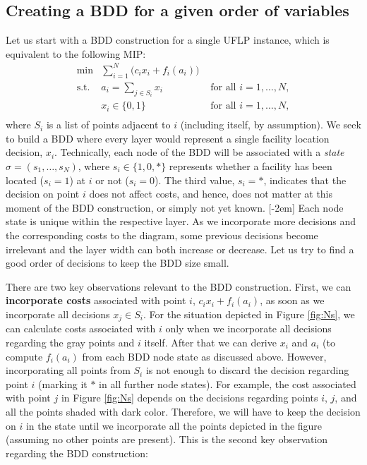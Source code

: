 \documentclass[11pt]{article}
\begin{document}
\subsection{Creating a BDD for a given order of variables}
\label{sec:org8e50c41}
Let us start with a BDD construction for a single UFLP instance, which is
equivalent to the following MIP: 
\begin{subequations}\label{eq:UFLP}
\begin{align}
  \min & \sum_{i=1}^N \Big(c_i x_i + f_i(a_i)\Big)&\\
    \textrm{s.t. } & a_i = \sum_{j\in S_i} x_i& \textrm{ for all } i=1,\ldots, N,\\
    & x_i\in\{0,1\} & \textrm{ for all } i=1,\ldots,N,\\
\end{align}
\end{subequations}
where \(S_i\) is a list of points adjacent to \textcircled{$i$} (including itself,
by assumption). We seek to build a BDD where every layer would represent a
single facility location decision, \(x_i\). Technically, each node of the BDD will
be associated with a \emph{state} \(\sigma = (s_1, \ldots, s_N)\), where
\(s_i\in\{1,0,*\}\) represents whether a facility has been located (\(s_i=1\)) at
\textcircled{$i$} or not (\(s_i=0\)). The third value, \(s_i=*\), indicates that the
decision on point \textcircled{$i$} does not affect costs, and hence, does not
matter at this moment of the BDD construction, or simply not yet known.
[-2em] Each node state
is unique within the respective layer. As we incorporate more decisions and the
corresponding costs to the diagram, some previous decisions become irrelevant
and the layer width can both increase or decrease. Let us try to find a good
order of decisions to keep the BDD size small.

There are two key observations relevant to the BDD construction. First, we can
\textbf{incorporate costs} associated with point \(i\), \(c_i x_i + f_i(a_i)\), as soon as
we incorporate all decisions \(x_j\in S_i\). For the situation depicted in Figure
\ref{fig:Ns}, we can calculate costs associated with \textcircled{$i$} only when
we incorporate all decisions regarding the gray points and \textcircled{$i$}
itself. After that we can derive \(x_i\) and \(a_i\) (to compute \(f_i(a_i)\) from
each BDD node state as discussed above. However, incorporating all points from
\(S_i\) is not enough to discard the decision regarding point \textcircled{$i$}
(marking it \(*\) in all further node states). For example, the cost associated
with point \textcircled{$j$} in Figure \ref{fig:Ns} depends on the decisions
regarding points \textcircled{$i$}, \textcircled{$j$}, and all the points shaded
with dark color. Therefore, we will have to keep the decision on
\textcircled{$i$} in the state until we incorporate all the points depicted in
the figure (assuming no other points are present). This is the second key
observation regarding the BDD construction:
\end{document}
